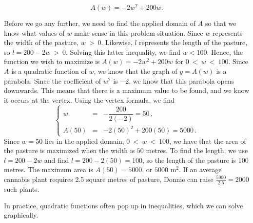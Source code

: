 \begin{example}
$$A(w) = -2w^2+200w.$$


Before we go any further, we need to find the applied domain of $A$ so that we know what values of $w$ make sense in this problem situation. Since $w$ represents the width of the pasture, $w~>~0$.  Likewise, $l$ represents the length of the pasture, so $l = 200-2w~>~0$.  Solving this latter inequality, we find $w < 100$.  Hence, the function we wish to maximize is $A(w) = -2w^2 + 200w$ for $0~<~w~<~100$.  Since $A$ is a quadratic function of $w$, we know that the graph of $y = A(w)$ is a parabola.  Since the coefficient of $w^2$ is $-2$, we know that this parabola opens downwards.  This means that there is a maximum value to be found, and we know it occurs at the vertex.  Using the vertex formula, we find 
$$
\left\{\begin{array}{rcl}
    w &=& -\dfrac{200}{2(-2)} = 50\,,  \\[0.2cm]
     A(50)& =& -2(50)^2 + 200(50) = 5000\,.
\end{array}\right.
$$ 
  Since $w=50$ lies in the applied domain, $0~<~w~<~100$, we have that the area of the pasture is maximized when the width is $50$ metres.  To find the length, we use $l = 200-2w$ and find $l = 200-2(50) = 100$, so the length of the pasture is $100$ metres.  The maximum area is $A(50) = 5000$, or $5000$ m$^2$.  If an average cannabis plant requires 2.5 square metres of pasture, Donnie can raise $\frac{5000}{2.5} = 2000$ such plants. 

\end{example}
\fi

In practice, quadratic functions often pop up in inequalities, which we can solve graphically.


